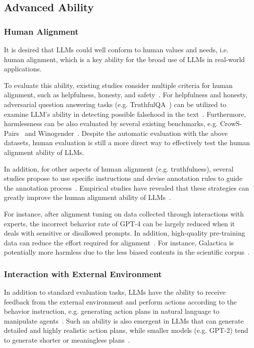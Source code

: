 {{{\subsection{Advanced Ability}\label{sec:superior}

\subsubsection{Human Alignment} It is desired that LLMs could  well conform to human values and needs, i.e. human alignment, which is a key ability  for the broad use of LLMs in real-world applications. 

To evaluate this ability, existing studies consider multiple criteria for human alignment, such as helpfulness, honesty, and safety~\cite{Askell-arxiv-2021-A,OpenAI-OpenAI-2023-GPT-4,Bai-arxiv-2022-Training}. For helpfulness and honesty,  adversarial question answering tasks (e.g. TruthfulQA~\cite{Lin-ACL-2022-TruthfulQA})  can be utilized to examine LLM's ability in detecting possible falsehood in the text~\cite{Nakano-arxiv-2021-WebGPT,OpenAI-OpenAI-2023-GPT-4}. Furthermore, harmlessness can  be also evaluated by several existing benchmarks, e.g. CrowS-Pairs~\cite{Nangia-EMNLP-2020-CrowS} and  Winogender~\cite{Rudinger-NAACL-2018-Gender}. Despite the automatic evaluation with the above datasets, human evaluation is still a more direct way to effectively test the human alignment ability of LLMs.

In addition, for other aspects of human alignment (e.g. truthfulness),  several studies propose to use  specific instructions and devise annotation rules to guide the annotation process~\cite{Nakano-arxiv-2021-WebGPT}. Empirical studies have revealed that these strategies can greatly improve the human alignment ability of LLMs~\cite{Bai-arxiv-2022-Training}.  

{For instance, after alignment tuning on data collected through interactions with experts, the incorrect behavior rate of GPT-4 can be largely reduced  when it deals with sensitive or disallowed prompts. } {In addition, high-quality pre-training data can reduce the effort required for alignment~\cite{OpenAI-OpenAI-2023-GPT-4}.} For instance, Galactica is potentially more  harmless due to the less biased contents in the scientific corpus~\cite{Taylor-arxiv-2022-Galactica}.

\subsubsection{Interaction with External Environment} In addition to standard evaluation tasks, LLMs have the ability to receive feedback from the external environment and perform actions  according to the behavior instruction, e.g. generating action plans in natural language to manipulate agents~\cite{Huang-ICML-2022-Language,Carta-arxiv-2023-Grounding}. Such an ability is also emergent in LLMs  that can generate detailed and highly realistic action plans, while smaller models (e.g. GPT-2) tend to generate shorter or meaningless plans~\cite{Huang-ICML-2022-Language}. 

}}}
